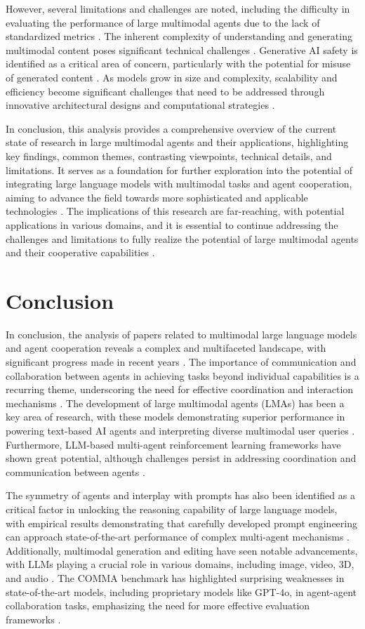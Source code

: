 \documentclass[conference]{IEEEtran}
\begin{document}
However, several limitations and challenges are noted, including the difficulty in evaluating the performance of large multimodal agents due to the lack of standardized metrics \cite{b15}. The inherent complexity of understanding and generating multimodal content poses significant technical challenges \cite{b16}. Generative AI safety is identified as a critical area of concern, particularly with the potential for misuse of generated content \cite{b17}. As models grow in size and complexity, scalability and efficiency become significant challenges that need to be addressed through innovative architectural designs and computational strategies \cite{b18}.

In conclusion, this analysis provides a comprehensive overview of the current state of research in large multimodal agents and their applications, highlighting key findings, common themes, contrasting viewpoints, technical details, and limitations. It serves as a foundation for further exploration into the potential of integrating large language models with multimodal tasks and agent cooperation, aiming to advance the field towards more sophisticated and applicable technologies \cite{b19}. The implications of this research are far-reaching, with potential applications in various domains, and it is essential to continue addressing the challenges and limitations to fully realize the potential of large multimodal agents and their cooperative capabilities \cite{b20}.

\section{Conclusion}
In conclusion, the analysis of papers related to multimodal large language models and agent cooperation reveals a complex and multifaceted landscape, with significant progress made in recent years \cite{b1}. The importance of communication and collaboration between agents in achieving tasks beyond individual capabilities is a recurring theme, underscoring the need for effective coordination and interaction mechanisms \cite{b2}. The development of large multimodal agents (LMAs) has been a key area of research, with these models demonstrating superior performance in powering text-based AI agents and interpreting diverse multimodal user queries \cite{b3}. Furthermore, LLM-based multi-agent reinforcement learning frameworks have shown great potential, although challenges persist in addressing coordination and communication between agents \cite{b4}.

The symmetry of agents and interplay with prompts has also been identified as a critical factor in unlocking the reasoning capability of large language models, with empirical results demonstrating that carefully developed prompt engineering can approach state-of-the-art performance of complex multi-agent mechanisms \cite{b5}. Additionally, multimodal generation and editing have seen notable advancements, with LLMs playing a crucial role in various domains, including image, video, 3D, and audio \cite{b6}. The COMMA benchmark has highlighted surprising weaknesses in state-of-the-art models, including proprietary models like GPT-4o, in agent-agent collaboration tasks, emphasizing the need for more effective evaluation frameworks \cite{b7}.
\end{document}
